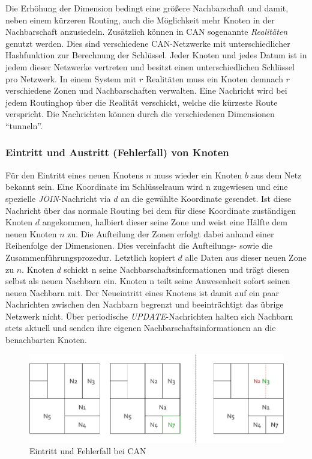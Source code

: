 Die Erhöhung der Dimension bedingt eine größere Nachbarschaft und damit, neben einem kürzeren Routing, auch die Möglichkeit mehr Knoten in der Nachbarschaft anzusiedeln. Zusätzlich können in CAN sogenannte \emph{Realitäten} genutzt werden. Dies sind verschiedene CAN-Netzwerke mit unterschiedlicher Hashfunktion zur Berechnung der Schlüssel. Jeder Knoten und jedes Datum ist in jedem dieser Netzwerke vertreten und besitzt einen unterschiedlichen Schlüssel pro Netzwerk. In einem System mit $r$ Realitäten muss ein Knoten demnach $r$ verschiedene Zonen und Nachbarschaften verwalten. Eine Nachricht wird bei jedem Routinghop über die Realität verschickt, welche die kürzeste Route verspricht. Die Nachrichten können durch die verschiedenen Dimensionen \enquote{tunneln}.

\subsubsection{Eintritt und Austritt (Fehlerfall) von Knoten}
Für den Eintritt eines neuen Knotens $n$ muss wieder ein Knoten $b$ aus dem Netz bekannt sein. Eine Koordinate im Schlüsselraum wird n zugewiesen und eine spezielle \emph{JOIN}-Nachricht via $d$ an die gewählte Koordinate gesendet. Ist diese Nachricht über das normale Routing bei dem für diese Koordinate zuständigen Knoten $d$ angekommen, halbiert dieser seine Zone und weist eine Hälfte dem neuen Knoten $n$ zu. Die Aufteilung der Zonen erfolgt dabei anhand einer Reihenfolge der Dimensionen. Dies vereinfacht die Aufteilungs- sowie die Zusammenführungsprozedur. Letztlich kopiert $d$ alle Daten aus dieser neuen Zone zu $n$. Knoten $d$ schickt n seine Nachbarschaftsinformationen und trägt diesen selbst als neuen Nachbarn ein. Knoten n teilt seine Anwesenheit sofort seinen neuen Nachbarn mit. Der Neueintritt eines Knotens ist damit auf ein paar Nachrichten zwischen den Nachbarn begrenzt und beeinträchtigt das übrige Netzwerk nicht. Über periodische \emph{UPDATE}-Nachrichten halten sich Nachbarn stets aktuell und senden ihre eigenen Nachbarschaftsinformationen an die benachbarten Knoten.

\begin{figure}[htbp]
\centering
\includegraphics{grafics/can_new_node.pdf}
\caption{Eintritt und Fehlerfall bei CAN}
\label{fig:can_new_node}
\end{figure}

